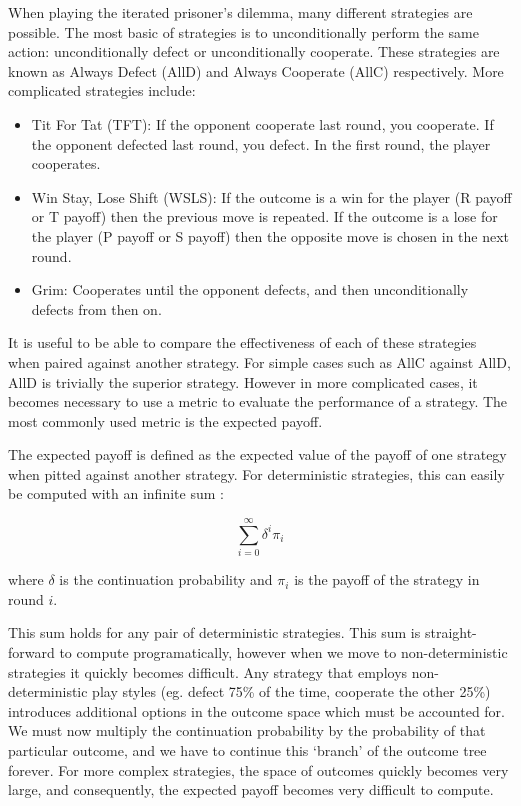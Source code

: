 \documentclass[a4paper,12pt]{article}
\begin{document}
When playing the iterated prisoner's dilemma, many different strategies are possible.
The most basic of strategies is to unconditionally perform the same action: unconditionally defect or unconditionally cooperate.
These strategies are known as Always Defect (AllD) and Always Cooperate (AllC) respectively.
More complicated strategies include:

\begin{itemize}
    \item Tit For Tat (TFT): If the opponent cooperate last round, you cooperate. If the opponent defected last round, you defect. In the first round, the player cooperates.
    \item Win Stay, Lose Shift (WSLS): If the outcome is a win for the player (R payoff or T payoff) then the previous move is repeated. If the outcome is a lose for the player (P payoff or S payoff) then the opposite move is chosen in the next round.
    \item Grim: Cooperates until the opponent defects, and then unconditionally defects from then on.
\end{itemize}

It is useful to be able to compare the effectiveness of each of these strategies when paired against another strategy.
For simple cases such as AllC against AllD, AllD is trivially the superior strategy.
However in more complicated cases, it becomes necessary to use a metric to evaluate the performance of a strategy.
The most commonly used metric is the expected payoff.

The expected payoff is defined as the expected value of the payoff of one strategy when pitted against another strategy.
For deterministic strategies, this can easily be computed with an infinite sum \cite{garciaandtraulsen}:

\begin{equation}
    \sum_{i=0}^{\infty} \delta^i \pi_i
\end{equation}

where $\delta$ is the continuation probability and $\pi_i$ is the payoff of the strategy in round $i$.

This sum holds for any pair of deterministic strategies.
This sum is straight-forward to compute programatically, however when we move to non-deterministic strategies it quickly becomes difficult.
Any strategy that employs non-deterministic play styles (eg. defect 75\% of the time, cooperate the other 25\%) introduces additional options in the outcome space which must be accounted for.
We must now multiply the continuation probability by the probability of that particular outcome, and we have to continue this `branch' of the outcome tree forever.
For more complex strategies, the space of outcomes quickly becomes very large, and consequently, the expected payoff becomes very difficult to compute.
\end{document}

